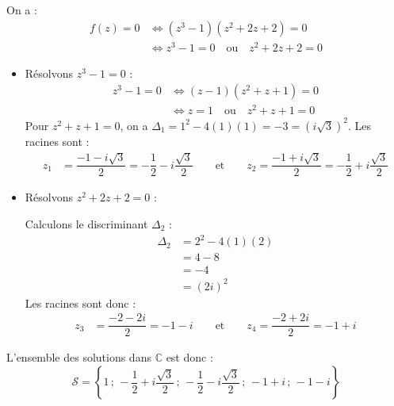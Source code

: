 \documentclass[12pt,a4paper]{article}
\begin{document}
\begin{enumerate}
    On a :
    $$
    \begin{aligned}
        f(z) = 0 &\iff (z^3 - 1)(z^2 + 2z + 2) = 0 \\
        &\iff z^3 - 1 = 0 \quad \text{ou} \quad z^2 + 2z + 2 = 0
    \end{aligned}
    $$
    \begin{itemize}
        \item Résolvons $z^3 - 1 = 0$ :
        $$
        \begin{aligned}
            z^3 - 1 = 0 &\iff (z - 1)(z^2 + z + 1) = 0 \\
            &\iff z = 1 \quad \text{ou} \quad z^2 + z + 1 = 0
        \end{aligned}
        $$
        Pour $z^2 + z + 1 = 0$, on a $\Delta_1 = 1^2 - 4(1)(1) = -3 = (i\sqrt{3})^2$. Les racines sont :
        $$
        \begin{aligned}
            z_1 &= \dfrac{-1 - i\sqrt{3}}{2} = -\dfrac{1}{2} - i\dfrac{\sqrt{3}}{2} \qquad \text{et} \qquad z_2 = \dfrac{-1 + i\sqrt{3}}{2} = -\dfrac{1}{2} + i\dfrac{\sqrt{3}}{2}
        \end{aligned}
        $$

        \item Résolvons $z^2 + 2z + 2 = 0$ :
        
        Calculons le discriminant $\Delta_2$ :
        $$
        \begin{aligned}
            \Delta_2 &= 2^2 - 4(1)(2) \\
            &= 4 - 8 \\
            &= -4 \\
            &= (2i)^2
        \end{aligned}
        $$
        Les racines sont donc :
        $$
        \begin{aligned}
            z_3 &= \dfrac{-2 - 2i}{2} = -1 - i \qquad \text{et} \qquad z_4 = \dfrac{-2 + 2i}{2} = -1 + i
        \end{aligned}
        $$
    \end{itemize}
    L'ensemble des solutions dans $\mathbb{C}$ est donc :
    $$
    \mathcal{S} = \left\{ 1 \,;\, -\dfrac{1}{2} + i\dfrac{\sqrt{3}}{2} \,;\, -\dfrac{1}{2} - i\dfrac{\sqrt{3}}{2} \,;\, -1 + i \,;\, -1 - i \right\}
    $$


\end{enumerate}
\end{document}
